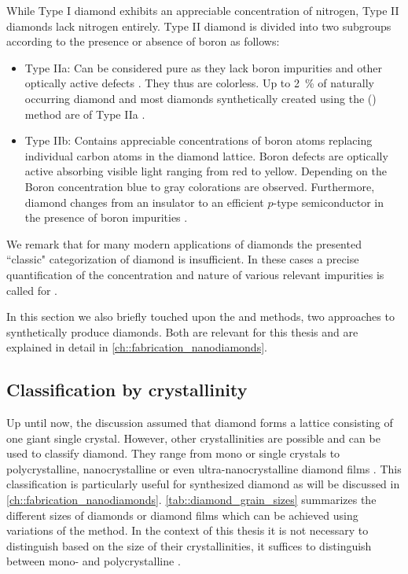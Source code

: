     While Type I diamond exhibits an appreciable concentration of nitrogen, Type II diamonds lack nitrogen entirely. Type II diamond is divided into two subgroups according to the presence or absence of boron as follows:

    \begin{itemize}
      \item Type IIa: Can be considered pure as they lack boron impurities and other optically active defects \cite{Walker1979}. They thus are colorless. Up to \SI{2}{\percent} of naturally occurring diamond and most diamonds synthetically created using the \cvd (\CVD) method are of Type IIa \cite{Zaitsev2001}.
      \item Type IIb: Contains appreciable concentrations of boron atoms replacing individual carbon atoms in the diamond lattice. Boron defects are optically active absorbing visible light ranging from red to yellow. Depending on the Boron concentration blue to gray colorations are observed. Furthermore, diamond changes from an insulator to an efficient $p$-type semiconductor in the presence of boron impurities \cite{Massarani1978}.
    \end{itemize}

    We remark that for many modern applications of diamonds the presented ``classic" categorization of diamond is insufficient. In these cases a precise quantification of the concentration and nature of various relevant impurities is called for \cite{Markham2011, Balasubramanian2009}.

    In this section we also briefly touched upon the \CVD and \HPHT methods, two approaches to synthetically produce diamonds. Both are relevant for this thesis and are explained in detail in \autoref{ch::fabrication_nanodiamonds}.

  \subsection{Classification by crystallinity}

    Up until now, the discussion assumed that diamond forms a lattice consisting of one giant single crystal. However, other crystallinities are possible and can be used to classify diamond.
    They range from mono or single crystals to polycrystalline, nanocrystalline or even ultra-nanocrystalline diamond films \cite{May2000}. This classification is particularly useful for synthesized diamond as will be discussed in \autoref{ch::fabrication_nanodiamonds}. \autoref{tab::diamond_grain_sizes} summarizes the different sizes of diamonds or diamond films which can be achieved using variations of the \CVD method. In the context of this thesis it is not necessary to distinguish \nds based on the size of their crystallinities, it suffices to distinguish between mono- and polycrystalline \nds. 

